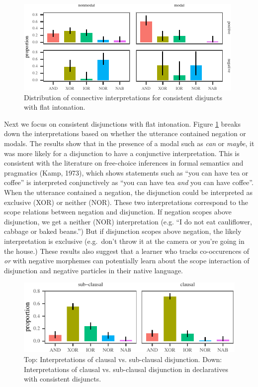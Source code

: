 \documentclass[,man,floatsintext]{apa6}
\begin{document}
\begin{figure}[tb]

{\centering \includegraphics{figs/negModalPlot-1} 

}

\caption{Distribution of connective interpretations for consistent disjuncts with flat intonation.}\label{fig:negModalPlot}
\end{figure}

Next we focus on consistent disjunctions with flat intonation. Figure \ref{fig:negModalPlot} breaks down the interpretations based on whether the utterance contained negation or modals. The results show that in the presence of a modal such as \emph{can} or \emph{maybe}, it was more likely for a disjunction to have a conjunctive interpretation. This is consistent with the literature on free-choice inferences in formal semantics and pragmatics (Kamp, 1973), which shows statements such as \enquote{you can have tea or coffee} is interpreted conjunctively as \enquote{you can have tea \emph{and} you can have coffee}. When the utterance contained a negation, the disjunction could be interpreted as exclusive (XOR) or neither (NOR). These two interpretations correspond to the scope relations between negation and disjunction. If negation scopes above disjunction, we get a neither (NOR) interpretation (e.g. \enquote{I do not eat cauliflower, cabbage or baked beans.}) But if disjunction scopes above negation, the likely interpretation is exclusive (e.g.~don't throw it at the camera or you're going in the house.) These results also suggest that a learner who tracks co-occurences of \emph{or} with negative morphemes can potentially learn about the scope interaction of disjunction and negative particles in their native language.

\begin{figure}[tb]

{\centering \includegraphics{figs/syntaxPlot-1} 

}

\caption{Top: Interpretations of clausal vs. sub-clausal disjunction. Down: Interpretations of clausal vs. sub-clausal disjunction in declaratives with consistent disjuncts.}\label{fig:syntaxPlot}
\end{figure}
\end{document}
